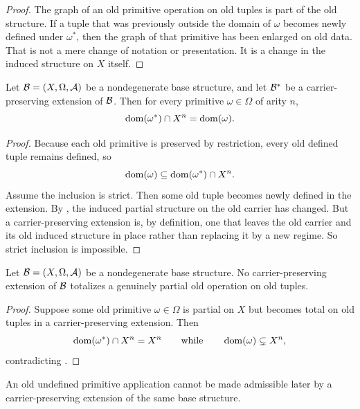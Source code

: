 \begin{proof}
The graph of an old primitive operation on old tuples is part of the old structure. If a tuple that was previously outside the domain of $\omega$ becomes newly defined under $\omega^*$, then the graph of that primitive has been enlarged on old data. That is not a mere change of notation or presentation. It is a change in the induced structure on $X$ itself.
\end{proof}

\begin{lemma}\label{lem:domain-fixity}
Let $\mathcal{B}=(X,\Omega,\mathcal{A})$ be a nondegenerate base structure, and let $\mathcal{B}^*$ be a carrier-preserving extension of $\mathcal{B}$. Then for every primitive $\omega\in\Omega$ of arity $n$,
\[
\operatorname{dom}(\omega^*)\cap X^n = \operatorname{dom}(\omega).
\]
\end{lemma}

\begin{proof}
Because each old primitive is preserved by restriction, every old defined tuple remains defined, so
\[
\operatorname{dom}(\omega)\subseteq \operatorname{dom}(\omega^*)\cap X^n.
\]
Assume the inclusion is strict. Then some old tuple becomes newly defined in the extension. By , the induced partial structure on the old carrier has changed. But a carrier-preserving extension is, by definition, one that leaves the old carrier and its old induced structure in place rather than replacing it by a new regime. So strict inclusion is impossible.
\end{proof}

\begin{theorem}\label{thm:no-internal-totalization}
Let $\mathcal{B}=(X,\Omega,\mathcal{A})$ be a nondegenerate base structure. No carrier-preserving extension of $\mathcal{B}$ totalizes a genuinely partial old operation on old tuples.
\end{theorem}

\begin{proof}
Suppose some old primitive $\omega\in\Omega$ is partial on $X$ but becomes total on old tuples in a carrier-preserving extension. Then
\[
\operatorname{dom}(\omega^*)\cap X^n = X^n
\qquad\text{while}\qquad
\operatorname{dom}(\omega)\subsetneq X^n,
\]
contradicting .
\end{proof}

\begin{corollary}\label{cor:no-posthoc}
An old undefined primitive application cannot be made admissible later by a carrier-preserving extension of the same base structure.
\end{corollary}

